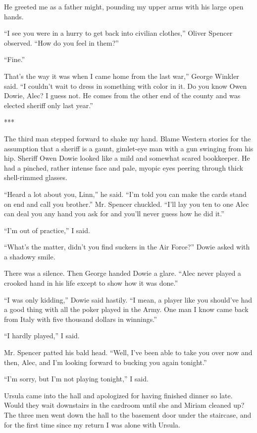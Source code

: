 \documentclass{novel}
\begin{document}
He greeted me as a father might, pounding my upper arms with his large open hands.

“I see you were in a hurry to get back into civilian clothes,” Oliver Spencer observed. “How do you feel in them?”

“Fine.”

That’s the way it was when I came home from the last war,” George Winkler said. “I couldn’t wait to dress in something with color in it. Do you know Owen Dowie, Alec? I guess not. He comes from the other end of the county and was elected sheriff only last year.”

***

The third man stepped forward to shake my hand. Blame Western stories for the assumption that a sheriff is a gaunt, gimlet-eye man with a gun swinging from his hip. Sheriff Owen Dowie looked like a mild and somewhat scared bookkeeper. He had a pinched, rather intense face and pale, myopic eyes peering through thick shell-rimmed glasses.

“Heard a lot about you, Linn,” he said. “I’m told you can make the cards stand on end and call you brother.” Mr. Spencer chuckled. “I’ll lay you ten to one Alec can deal you any hand you ask for and you’ll never guess how he did it.”

“I’m out of practice,” I said.

“What’s the matter, didn’t you find suckers in the Air Force?” Dowie asked with a shadowy smile.

There was a silence. Then George handed Dowie a glare. “Alec never played a crooked hand in his life except to show how it was done.”

“I was only kidding,” Dowie said hastily. “I mean, a player like you should’ve had a good thing with all the poker played in the Army. One man I know came back from Italy with five thousand dollars in winnings.”

“I hardly played,” I said.

Mr. Spencer patted his bald head. “Well, I’ve been able to take you over now and then, Alec, and I’m looking forward to bucking you again tonight.”

“I’m sorry, but I’m not playing tonight,” I said.

Ursula came into the hall and apologized for having finished dinner so late. Would they wait downstairs in the cardroom until she and Miriam cleaned up? The three men went down the hall to the basement door under the staircase, and for the first time since my return I was alone with Ursula.
\end{document}
